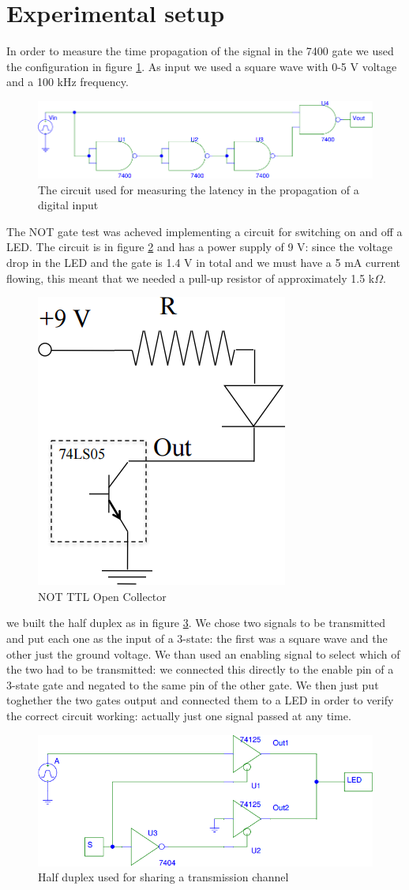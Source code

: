 \section{Experimental setup}
In order to measure the time propagation of the signal in the 7400 gate we used the configuration in figure \ref{latency}. As input we used a square wave with 0-5 V voltage and a 100 kHz frequency.
\begin{figure}[H]
\centering
\includegraphics[width=.7\textwidth]{10/latency.png}
\caption{The circuit used for measuring the latency in the propagation of a digital input}\label{latency}
\end{figure}
The NOT gate test was acheved implementing a circuit for switching on and off a LED. The circuit is in figure \ref{LED_ON_OFF} and has a power supply of 9 V: since the voltage drop in the LED and the gate is 1.4 V in total and we must have a 5 mA current flowing, this meant that we needed a pull-up resistor of approximately 1.5 k$\Omega$.
\begin{figure}[H]
\centering
\includegraphics[width=.3\textwidth]{10/LED_ON_OFF.png}
\caption{NOT TTL Open Collector}\label{LED_ON_OFF}
\end{figure}
we built the half duplex as in figure \ref{TTL_3state}. We chose two signals to be transmitted and put each one as the input of a 3-state: the first was a square wave and the other just the ground voltage. We than used an enabling signal to select which of the two had to be transmitted: we connected this directly to the enable pin of a 3-state gate and negated to the same pin of the other gate. We then just put toghether the two gates output and connected them to a LED in order to verify the correct circuit working: actually just one signal passed at any time.
\begin{figure}[H]
\centering
\includegraphics[width=.7\textwidth]{10/TTL_3state.png}
\caption{Half duplex used for sharing a transmission channel}\label{TTL_3state}
\end{figure}
